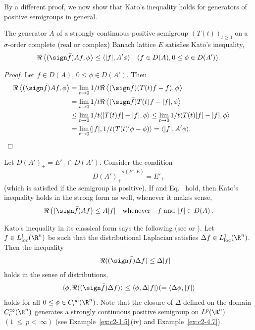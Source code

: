 By a different proof, we now show that Kato's inequality holds for generators of positive semigroups in general.
\begin{theorem}\label{thm:c2-2.4}
%
The generator $A$ of a strongly continuous positive semigroup $(T(t))_{t \geq 0}$ on a $\sigma$-order complete (real or complex) Banach lattice $E$ satisfies Kato's inequality, \ie
\begin{equation*}\label{eq:c2-K-2} %
\Re\left\langle(\sign \bar{f})Af,\phi \right\rangle \leq \langle |f|,A'\phi \rangle \quad (f \in D(A), 0 \leq \phi \in D(A')).
\end{equation*}
\end{theorem}
\begin{proof}
Let $f \in D(A)$, $0 \leq \phi \in D(A')$.
Then
\begin{align*}
\Re\left\langle(\sign \bar{f})Af, \phi \right\rangle 
	&= \lim_{t \to 0} 1/t \Re\left\langle(\sign \bar{f})(T(t)f - f), \phi \right\rangle \\
	&= \lim_{t \to 0} 1/t \Re\left\langle(\sign \bar{f})T(t)f - |f|, \phi \right\rangle \\
	&\leq \lim_{t \to 0} 1/t \langle |T(t)f| - |f|, \phi \rangle 
	\leq \lim_{t \to 0} 1/t \langle T(t)|f| - |f|, \phi \rangle\\
	&= \lim_{t \to 0} \langle |f|, 1/t(T(t)'\phi - \phi) \rangle
	= \langle |f|, A'\phi \rangle.
&&\qedhere
\end{align*}
\end{proof}
Let $D(A')_{+} = E'_{+} \cap D(A')$. 
Consider the condition
\begin{equation}\label{eq:c2-2.9}
\overline{D(A')_{+}}^{\sigma(E',E)} = E'_{+}
\end{equation}
(which is satisfied if the semigroup is positive). 
If    and Eq.~   hold, then Kato's inequality holds in the strong form as well, whenever it makes sense, \ie
\begin{equation}\label{eq:c2-2.10}
\Re\left((\sign \bar{f})Af \right) \leq A|f| \quad \text{whenever}\quad f \text{ and } |f| \in D(A)\,.
\end{equation}
\begin{example}\label{ex:c2-2.5}
%
Kato's inequality in its classical form says the following (see \textcite{kato:1973} or \textcite[X.27]{reedsimon:1975}).
Let $f \in L^1_{\text{loc}}(\R^n)$ be such that the distributional Laplacian satisfies $\Delta f \in L^1_{\text{loc}}(\R^n)$.
Then the inequality
\begin{equation*} \label{eq:c2-K-classic} \tag*{}
\Re((\sign \bar{f})\Delta f) \leq \Delta|f| 
\end{equation*}
holds in the sense of distributions, \ie
\[
\langle \phi, \Re((\sign \bar{f})\Delta f) \rangle \leq \langle \phi,\Delta|f| \rangle (= \langle \Delta \phi,|f| \rangle
\]
holds for all $0 \leq \phi \in C_{c}^{\infty}(\R^n)$.
Note that the closure of\/ $\Delta$ defined on the domain $C_{c}^{\infty}(\R^n)$ generates a strongly continuous positive semigroup on $L^p(\R^n)$ $(1~\leq~p <~\infty)$ (see Example~\ref{ex:c2-1.5}\,(iv) and Example~\ref{ex:c2-4.7}).
\end{example}
